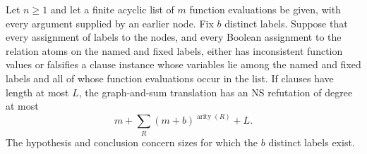 \begin{lemma}\label{tx:lem:finite-certificate}
Let $n\ge1$ and let a finite acyclic list of $m$ function evaluations be given, with every
argument supplied by an earlier node. Fix $b$ distinct labels. Suppose that
every assignment of labels to the nodes, and every Boolean assignment to
the relation atoms on the named and fixed labels, either has inconsistent
function values or falsifies a clause instance whose variables lie among the named and fixed
labels and all of whose function evaluations occur in the list. If clauses have length at most $L$, the
graph-and-sum translation has an NS refutation of degree at most
\[
                 m+\sum_R(m+b)^{\operatorname{arity}(R)}+L.
\]
The hypothesis and conclusion concern sizes for which the $b$ distinct
labels exist.
\end{lemma}
